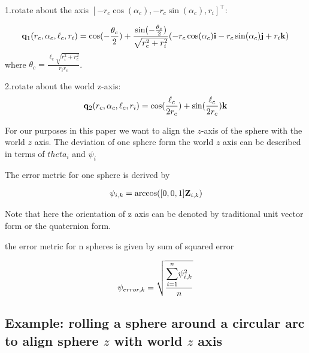 \documentclass[letter paper, 10pt, conference]{ieeeconf}
\begin{document}
1.rotate about the axis $[ -r_c \cos(\alpha_c), -r_c\sin(\alpha_c),r_i]^\top$:

\begin{align}
{\bf q}_1(r_c, \alpha_c, \ell_c, r_i)   = \cos( -\frac{\theta_c}{2})+ \frac{\sin({-\frac{\theta_c}{2}})}{\sqrt{r_c^2+r_i^2}}(-r_c\cos(\alpha_c){\bf i}-r_c\sin(\alpha_c){\bf j}+r_i{\bf k}) \label{eq:RotatingAboutACircleArc1}
       \end{align}
where $\theta_c=\frac{\ell_c\sqrt{r_i^2+r_c^2}}{r_ir_c}$.

2.rotate about the world z-axis:
\begin{align}
{\bf q}_2(r_c, \alpha_c, \ell_c, r_i)=\cos(\frac{\ell_c}{2r_c})+\sin(\frac{\ell_c}{2r_c}){\bf k}\label{eq:RotatingAboutACircleArc2}
\end{align}


For our purposes in this paper we want to align the $z$-axis of the sphere with the world $z$ axis.  The deviation of one sphere form the world  $z$ axis can be described in terms of $theta_i$ and $\psi_i$  


 The error metric for one sphere is derived by
 
\begin{align}
\psi_{i,k} = \arccos([0,0,1]{\bf Z}_{i,k}) \label{eq:errorForOneSphere}
\end{align}

Note that here the orientation of z axis can be denoted by traditional unit vector form or the quaternion form.

 the error metric for n spheres is given by sum of squared error
 
\begin{align}
\psi_{error,k} = \sqrt{\frac{\mathlarger{\sum}_{i=1}^{n}\psi_{i,k}^2}{n}} \label{eq:errorForManySpheres}
\end{align}



\subsection{Example: rolling a sphere around a circular arc to align sphere $z$ with world $z$ axis}
\end{document}
